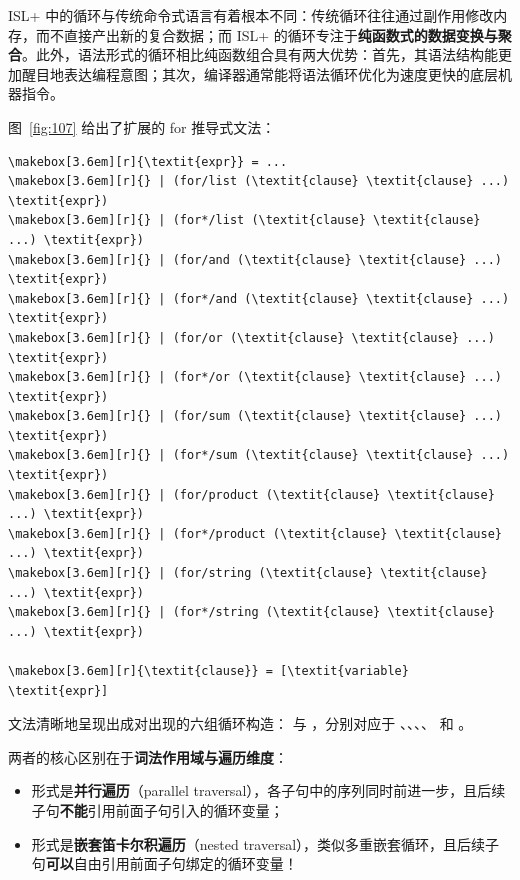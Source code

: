 ISL+ 中的循环与传统命令式语言有着根本不同：传统循环往往通过副作用修改内存，而不直接产出新的复合数据；而 ISL+ 的循环专注于\textbf{纯函数式的数据变换与聚合}。此外，语法形式的循环相比纯函数组合具有两大优势：首先，其语法结构能更加醒目地表达编程意图；其次，编译器通常能将语法循环优化为速度更快的底层机器指令。

图~\ref{fig:107} 给出了扩展的 for 推导式文法：

\begin{stepperbox}[unbreakable]
\begin{Verbatim}[commandchars=\\\{\}, fontsize=\footnotesize]
\makebox[3.6em][r]{\textit{expr}} = ...
\makebox[3.6em][r]{} | (for/list (\textit{clause} \textit{clause} ...) \textit{expr})
\makebox[3.6em][r]{} | (for*/list (\textit{clause} \textit{clause} ...) \textit{expr})
\makebox[3.6em][r]{} | (for/and (\textit{clause} \textit{clause} ...) \textit{expr})
\makebox[3.6em][r]{} | (for*/and (\textit{clause} \textit{clause} ...) \textit{expr})
\makebox[3.6em][r]{} | (for/or (\textit{clause} \textit{clause} ...) \textit{expr})
\makebox[3.6em][r]{} | (for*/or (\textit{clause} \textit{clause} ...) \textit{expr})
\makebox[3.6em][r]{} | (for/sum (\textit{clause} \textit{clause} ...) \textit{expr})
\makebox[3.6em][r]{} | (for*/sum (\textit{clause} \textit{clause} ...) \textit{expr})
\makebox[3.6em][r]{} | (for/product (\textit{clause} \textit{clause} ...) \textit{expr})
\makebox[3.6em][r]{} | (for*/product (\textit{clause} \textit{clause} ...) \textit{expr})
\makebox[3.6em][r]{} | (for/string (\textit{clause} \textit{clause} ...) \textit{expr})
\makebox[3.6em][r]{} | (for*/string (\textit{clause} \textit{clause} ...) \textit{expr})

\makebox[3.6em][r]{\textit{clause}} = [\textit{variable} \textit{expr}]
\end{Verbatim}
\end{stepperbox}
\label{fig:107}

文法清晰地呈现出成对出现的六组循环构造： 与 ，分别对应于 、、、、 和 。

两者的核心区别在于\textbf{词法作用域与遍历维度}：
\begin{itemize}
  \item {} 形式是\textbf{并行遍历}（parallel traversal），各子句中的序列同时前进一步，且后续子句\textbf{不能}引用前面子句引入的循环变量；
  \item {} 形式是\textbf{嵌套笛卡尔积遍历}（nested traversal），类似多重嵌套循环，且后续子句\textbf{可以}自由引用前面子句绑定的循环变量！
\end{itemize}

